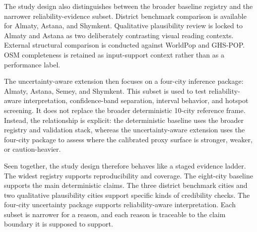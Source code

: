 The study design also distinguishes between the broader baseline registry and the narrower reliability-evidence subset. District benchmark comparison is available for Almaty, Astana, and Shymkent. Qualitative plausibility review is locked to Almaty and Astana as two deliberately contrasting visual reading contexts. External structural comparison is conducted against WorldPop and GHS-POP. OSM completeness is retained as input-support context rather than as a performance label.

The uncertainty-aware extension then focuses on a four-city inference package: Almaty, Astana, Semey, and Shymkent. This subset is used to test reliability-aware interpretation, confidence-band separation, interval behavior, and hotspot screening. It does not replace the broader deterministic 10-city reference frame. Instead, the relationship is explicit: the deterministic baseline uses the broader registry and validation stack, whereas the uncertainty-aware extension uses the four-city package to assess where the calibrated proxy surface is stronger, weaker, or caution-heavier.

Seen together, the study design therefore behaves like a staged evidence ladder. The widest registry supports reproducibility and coverage. The eight-city baseline supports the main deterministic claims. The three district benchmark cities and two qualitative plausibility cities support specific kinds of credibility checks. The four-city uncertainty package supports reliability-aware interpretation. Each subset is narrower for a reason, and each reason is traceable to the claim boundary it is supposed to support.


